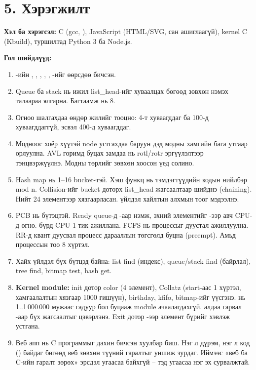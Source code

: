 \section*{5. Хэрэгжилт}

\textbf{Хэл ба хэрэгсэл:} C (gcc, ), JavaScript (HTML/SVG, сан ашиглаагүй), kernel C (Kbuild), туршилтад Python 3 ба Node.js.

\textbf{Гол шийдлүүд:}

\begin{enumerate}[leftmargin=22pt,itemsep=2pt,topsep=2pt]
  \item {}-ийн , , , , , -ийг өөрсдөө бичсэн.
  \item Queue ба stack нь ижил list\_head-ийг хуваалцах бөгөөд зөвхөн нэмэх талаараа ялгарна. Багтаамж нь 8.
  \item Огноо шалгахдаа өндөр жилийг тооцно: 4-т хуваагддаг ба 100-д хуваагддаггүй, эсвэл 400-д хуваагддаг.
  \item Модноос хоёр хүүтэй node устгахдаа баруун дэд модны хамгийн бага утгаар орлуулна. AVL горимд буцах замдаа  нь rotl/rotr эргүүлэлтээр тэнцвэржүүлнэ. Модны төрлийг зөвхөн хоосон үед солино.
  \item Hash map нь 1--16 bucket-тэй. Хэш функц нь тэмдэгтүүдийн кодын нийлбэр mod n. Collision-ийг bucket доторх list\_head жагсаалтаар шийднэ (chaining). Нийт 24 элементээр хязгаарласан.  үйлдэл хайлтын алхмын тоог мэдээлнэ.
  \item PCB нь  бүтэцтэй. Ready queue-д -аар нэмж, эхний элементийг -ээр авч CPU-д өгнө.  бүрд CPU 1 тик ажиллана. FCFS нь процессыг дуустал ажиллуулна. RR-д квант дуусвал процесс дарааллын төгсгөлд буцна (preempt). Амьд процессын тоо 8 хүртэл.
  \item Хайх үйлдэл бүх бүтцэд байна: list find (индекс), queue/stack find (байрлал), tree find, bitmap test, hash get.
  \item \textbf{Kernel module:} init дотор color (4 элемент), Collatz (start-аас 1 хүртэл, хамгаалалтын хязгаар 1000 гишүүн), birthday, kfifo, bitmap-ийг үүсгэнэ.  нь 1..1\,000\,000 мужаас гадуур бол  буцааж module ачаалагдахгүй.  алдаа гарвал -аар бүх жагсаалтыг цэвэрлэнэ. Exit дотор -ээр элемент бүрийг хэвлэж устгана.
  \item Веб апп нь C программыг дахин бичсэн хуулбар биш. Нэг л дүрэм, нэг л код () байдаг бөгөөд веб зөвхөн түүний  гаралтыг уншиж зурдаг. Иймээс «веб ба C-ийн гаралт зөрөх» эрсдэл угаасаа байхгүй -- тэд угаасаа нэг эх сурвалжтай.
\end{enumerate}

